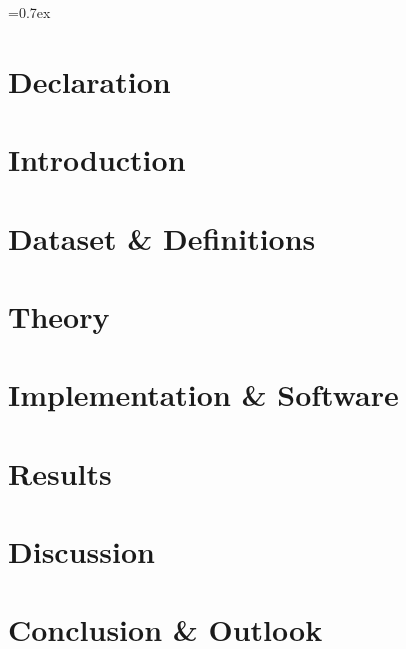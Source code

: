 


	
	\font=0.7ex%

	
	\tableofcontents
	\thispagestyle{empty}
	
	\pagestyle{fancy}
	\fancyhf{}
	\cfoot{\thepage}
	
	\newpage
	\section*{Declaration}
	
	
	\newpage
	\section{Introduction}
	
	
	\section{Dataset \& Definitions}
	
	
	\section{Theory}
	
	
	\section{Implementation \& Software}
	
	
	\section{Results}
	
	
	\section{Discussion}
	
	
	\section{Conclusion \& Outlook}
	

	\newpage
	\printbibliography
	

